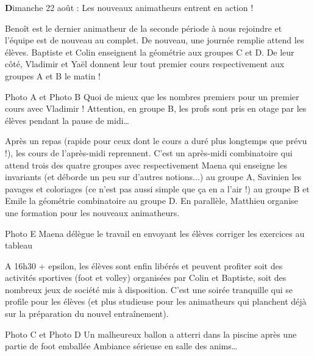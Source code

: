 \begin{center}
{\textbf Dimanche 22 août : Les nouveaux animatheurs entrent en action !}
\end{center}
\vspace{2mm}

Benoît est le dernier animatheur de la seconde période à nous rejoindre et l’équipe est de nouveau au complet. De nouveau, une journée remplie attend les élèves. Baptiste et Colin enseignent la géométrie aux groupes C et D. De leur côté, Vladimir et Yaël donnent leur tout premier cours respectivement aux groupes A et B le matin !

Photo A et Photo B
Quoi de mieux que les nombres premiers pour un premier cours avec Vladimir !
Attention, en groupe B, les profs sont pris en otage par les élèves pendant la pause de midi…

Après un repas (rapide pour ceux dont le cours a duré plus longtemps que prévu !), les cours de l’après-midi reprennent. C’est un après-midi combinatoire qui attend trois des quatre groupes avec respectivement Maena qui enseigne les invariants (et déborde un peu sur d’autres notions...)  au groupe A, Savinien les pavages et coloriages (ce n’est pas aussi simple que ça en a l’air !) au groupe B et Emile la géométrie combinatoire au groupe D. En parallèle, Matthieu organise une formation pour les nouveaux animatheurs.

Photo E
Maena délègue le travail en envoyant les élèves corriger les exercices au tableau

A 16h30 + epsilon, les élèves sont enfin libérés et peuvent profiter soit des activités sportives (foot et volley) organisées par Colin et Baptiste, soit des nombreux jeux de société mis à disposition. C’est une soirée tranquille qui se profile pour les élèves (et plus studieuse pour les animatheurs qui planchent déjà sur la préparation du nouvel entraînement).

Photo C et Photo D
Un malheureux ballon a atterri dans la piscine après une partie de foot emballée
Ambiance sérieuse en salle des anims…